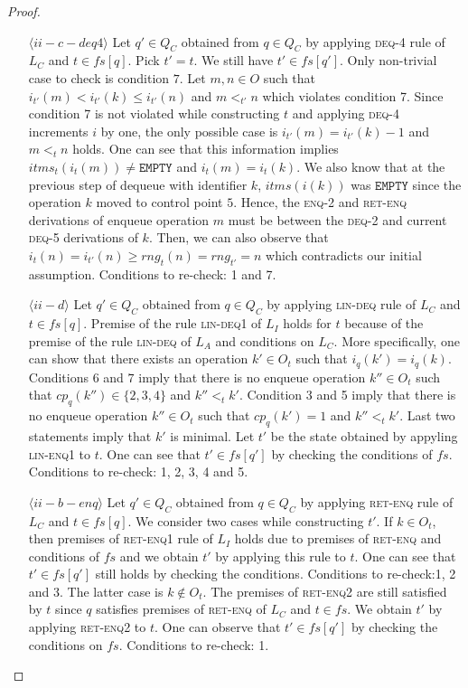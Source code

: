 \begin{proof}
\begin{itemize}
\item[$\langle ii-c-deq4 \rangle$]Let $q' \in Q_C$ obtained from $q \in Q_C$ by applying \textsc{deq-4} rule of $L_C$ and $t \in fs[q]$.  Pick $t' = t$. We still have $t' \in fs[q']$. Only non-trivial case to check is condition $7$. Let $m,n \in O$ such that $i_{t'}(m) < i_{t'}(k) \leq i_{t'}(n)$ and $m <_{t'} n$ which violates condition 7. Since condition 7 is not violated while constructing $t$ and applying \textsc{deq-4} increments $i$ by one, the only possible case is $i_{t'}(m) = i_{t'}(k)-1$ and $m <_t n$ holds. One can see that this information implies $itms_t(i_t(m)) \neq \texttt{EMPTY}$ and $i_t(m) = i_t(k)$. We also know that at the previous step of dequeue with identifier $k$, $itms(i(k))$ was $\texttt{EMPTY}$ since the operation $k$ moved to control point $5$. Hence, the \textsc{enq-2} and \textsc{ret-enq} derivations of enqueue operation $m$ must be between the \textsc{deq-2} and current \textsc{deq-5} derivations of $k$. Then, we can also observe that $i_t(n) = i_{t'}(n) \geq rng_t(n) = rng_{t'}=n$ which contradicts our initial assumption. Conditions to re-check: 1 and 7.
\item[$\langle ii-d \rangle$]Let $q' \in Q_C$ obtained from $q \in Q_C$ by applying \textsc{lin-deq} rule of $L_C$ and $t \in fs[q]$. Premise of the rule \textsc{lin-deq1} of $L_I$ holds for $t$ because of the premise of the rule \textsc{lin-deq} of $L_A$ and conditions on $L_C$. More specifically, one can show that there exists an operation $k' \in O_t$ such that $i_q(k') = i_q(k)$. Conditions $6$ and $7$ imply that there is no enqueue operation $k'' \in O_t$ such that $cp_q(k'') \in \{2,3,4\}$ and $k'' <_t k'$. Condition 3 and 5 imply that there is no enqueue operation $k'' \in O_t$ such that $cp_q(k') = 1$ and $k'' <_t k'$. Last two statements imply that $k'$ is minimal. Let $t'$ be the state obtained by appyling \textsc{lin-enq1} to $t$. One can see that $t' \in fs[q']$ by checking the conditions of $fs$. Conditions to re-check: 1, 2, 3, 4 and 5.
\item[$\langle ii-b-enq \rangle$] Let $q' \in Q_C$ obtained from $q \in Q_C$ by applying \textsc{ret-enq} rule of $L_C$ and $t \in fs[q]$. We consider two cases while constructing $t'$. If $k \in O_t$, then premises of \textsc{ret-enq1} rule of $L_I$ holds due to premises of \textsc{ret-enq} and conditions of $fs$ and we obtain $t'$ by applying this rule to $t$. One can see that $t' \in fs[q']$ still holds by checking the conditions. Conditions to re-check:1, 2 and 3. The latter case is $k \notin O_t$. The premises of \textsc{ret-enq2} are still satisfied by $t$ since $q$ satisfies premises of \textsc{ret-enq} of $L_C$ and $t \in fs$. We obtain $t'$ by applying \textsc{ret-enq2} to $t$. One can observe that $t' \in fs[q']$ by checking the conditions on $fs$. Conditions to re-check: 1.

\end{itemize}
\end{proof}
